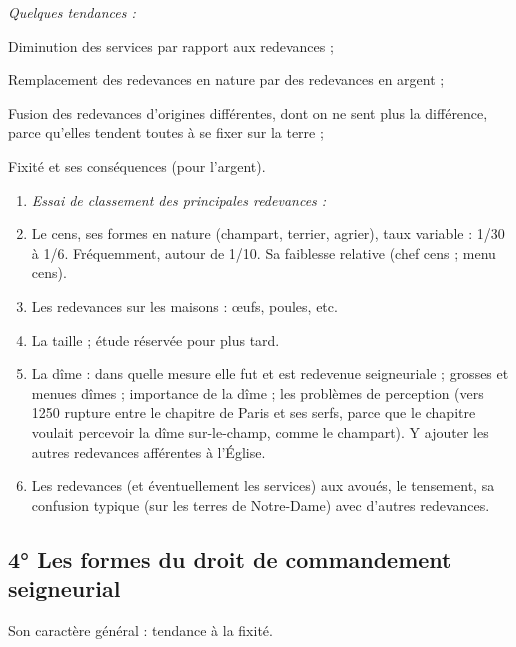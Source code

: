 \documentclass[french,twoside]{book} %
\newlength{\listmod}
\newcommand{\listhead}[1]{\hspace{-1\listmod}\emph{#1}}
\begin{document}
\begin{listalpha}[itemsep=0pt,]
\item[]\listhead{Quelques tendances :}
\item Diminution des services par rapport aux redevances ;
\item Remplacement des redevances en nature par des redevances en argent ;
\item Fusion des redevances d’origines différentes, dont on ne sent plus la différence, parce qu’elles tendent toutes à se fixer sur la terre ;
\item Fixité et ses conséquences (pour l’argent).

\end{listalpha}
\begin{enumerate}[itemsep=0pt,]
\item[]\listhead{Essai de classement des principales redevances :}
\item Le cens, ses formes en nature (champart, terrier, agrier), taux variable : 1/30 à 1/6. Fréquemment, autour de 1/10. Sa faiblesse relative (chef cens ; menu cens).
\item Les redevances sur les maisons : œufs, poules, etc.
\item La taille ; étude réservée pour plus tard.
\item La dîme : dans quelle mesure elle fut et est redevenue seigneuriale ; grosses et menues dîmes ; importance de la dîme ; les problèmes de perception (vers 1250 rupture entre le chapitre de Paris et ses serfs, parce que le chapitre voulait percevoir la dîme sur-le-champ, comme le champart). Y ajouter les autres redevances afférentes à l’Église.  
\label{p58}
\item Les redevances (et éventuellement les services) aux avoués, le tensement, sa confusion typique (sur les terres de Notre-Dame) avec d’autres redevances.

\end{enumerate}\subsection[4° Les formes du droit de commandement seigneurial]{4° Les formes du droit de commandement seigneurial}
\noindent Son caractère général : tendance à la fixité.\par
\end{document}
